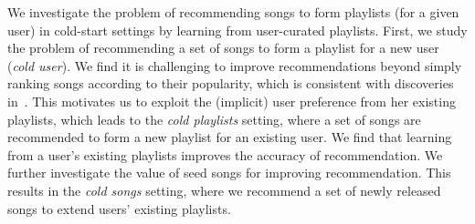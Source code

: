 We investigate the problem of recommending songs to form playlists (for a given user)
in cold-start settings by learning from user-curated playlists.
First, we study the problem of recommending a set of songs to form a playlist for a new user (\ie \emph{cold user}).
We find it is challenging to improve recommendations beyond simply ranking songs according to their popularity,
which is consistent with discoveries in~\cite{mcfee2012million,bonnin2013evaluating,bonnin2015automated}.
%
This motivates us to exploit the (implicit) user preference from her existing playlists,
which leads to the \emph{cold playlists} setting,
where a set of songs are recommended to form a new playlist for an existing user. %
We find that learning from a user's existing playlists %
improves the accuracy of recommendation.
%
We further investigate the value of seed songs for improving recommendation.
This results in the \emph{cold songs} setting,
where we recommend a set of newly released songs to extend users' existing playlists. %
%

